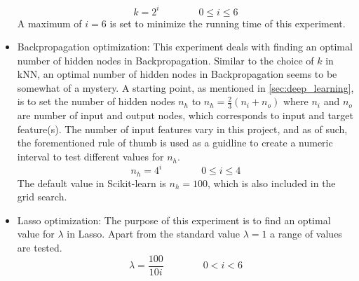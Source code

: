 \begin{itemize}
			\begin{equation}
				k = 2^i \qquad \qquad 0 \leq i \leq 6
			\end{equation}
			A maximum of $i = 6$ is set to minimize the running time of this experiment. 
		\item{Backpropagation optimization: } This experiment deals with finding an optimal number of hidden nodes in Backpropagation. Similar to the choice of $k$ in kNN, an optimal number of hidden nodes in Backpropagation seems to be somewhat of a mystery. A starting point, as mentioned in \ref{sec:deep_learning}, is to set the number of hidden nodes $n_h$ to $n_h = \frac{2}{3}(n_i + n_o)$ where $n_i$ and $n_o$ are number of input and output nodes, which corresponds to input and target feature(s). The number of input features vary in this project, and as of such, the forementioned rule of thumb is used as a guidline to create a numeric interval to test different values for $n_h$.
			\begin{equation}
				n_h = 4^i \qquad \qquad 0 \leq i \leq 4
			\end{equation}
			The default value in Scikit-learn is $n_h = 100$, which is also included in the grid search.
		\item{Lasso optimization: } The purpose of this experiment is to find an optimal value for $\lambda$ in Lasso. Apart from the standard value $\lambda = 1$ a range of values are tested.
			\begin{equation}
				\lambda = \frac{100}{10i} \qquad \qquad 0 < i < 6
			\end{equation} 
	\end{itemize}

